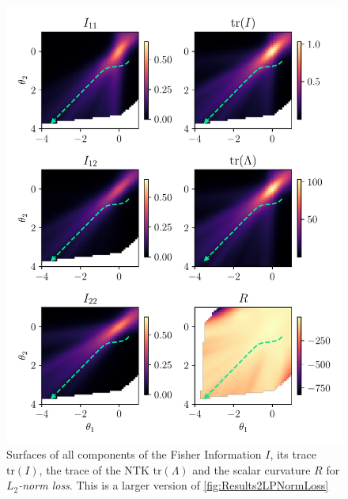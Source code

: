 \begin{figure}
	\centering
	\includegraphics{Experiment2/plots/LPNormLoss2_tracecomparison_Big.pdf}
	\caption{Surfaces of all components of the Fisher Information $I$, its trace $\mathrm{tr}(I)$, the trace of the NTK $\mathrm{tr}(\Lambda)$ and the scalar curvature $R$ for \emph{$L_2$-norm loss}. This is a larger version of \cref{fig:Results2LPNormLoss}}
	\label{fig:Results2LPNormLossBig}
\end{figure}


